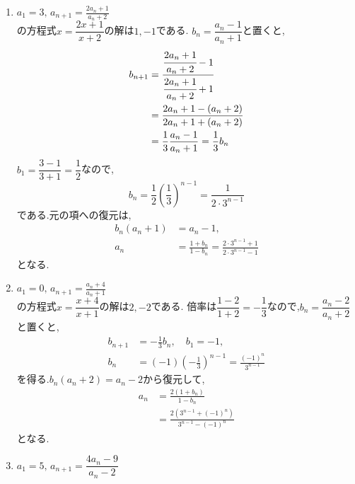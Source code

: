     \noindent{}\par\nobreak
    \begin{enumerate}[label=(\arabic*),parsep=3pt,format=\bookitemlink{example-mobius-1}{solution}{problem}]
      \item $\displaystyle a_1=3,\, a_{n+1}=\frac{2a_n+1}{a_n+2}$\\
            の方程式$x=\dfrac{2x+1}{x+2}$の解は$1,-1$である.
            $b_n=\dfrac{a_n-1}{a_n+1}$と置くと,
            \begin{align*}
              b_{n+1}&=\cfrac{\cfrac{2a_n+1}{a_n+2}-1}{\cfrac{2a_n+1}{a_n+2}+1}\\
              &=\frac{2a_n+1-(a_n+2)}{2a_n+1+(a_n+2)}\\
              &=\frac13\frac{a_n-1}{a_n+1}=\frac13b_n
            \end{align*}
            $b_1=\dfrac{3-1}{3+1}=\dfrac{1}{2}$なので,
            \[
              b_n=\frac12\left(\frac13\right)^{n-1}
                =\frac1{2\cdot3^{n-1}}
            \]
            である.元の項への復元は,
            \begin{align*}
              b_n(a_n+1)&=a_n-1,\\
              a_n&=\frac{1+b_n}{1-b_n}
                =\frac{2\cdot3^{n-1}+1}{2\cdot3^{n-1}-1}
            \end{align*}
            となる.
      \item $\displaystyle a_1=0,\, a_{n+1}=\frac{a_n+4}{a_n+1}$\\
            の方程式$x=\dfrac{x+4}{x+1}$の解は$2,-2$である.
            倍率は$\dfrac{1-2}{1+2}=-\dfrac{1}{3}$なので,$b_n=\dfrac{a_n-2}{a_n+2}$と置くと,
            \begin{align*}
              b_{n+1}&=-\frac13b_n,\quad b_1=-1,\\
              b_n&=(-1)\left(-\frac13\right)^{n-1}
                =\frac{(-1)^n}{3^{n-1}}
            \end{align*}
            を得る.$b_n(a_n+2)=a_n-2$から復元して,
            \begin{align*}
              a_n&=\frac{2(1+b_n)}{1-b_n}\\
              &=\frac{2\left(3^{n-1}+(-1)^n\right)}{3^{n-1}-(-1)^n}
            \end{align*}
            となる.
      \item $\displaystyle a_1=5,\, a_{n+1}=\dfrac{4a_n-9}{a_n-2}$\\

\end{enumerate}

